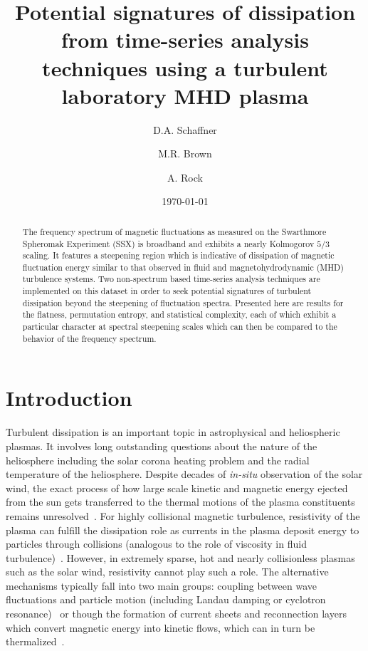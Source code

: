 \documentclass[aip,pop,amsmath,amssymb,preprint,superscriptaddress]{revtex4-1} %
\begin{document}
\title{Potential signatures of dissipation from time-series analysis techniques using a turbulent laboratory MHD plasma}
\author{D.A. Schaffner}
\author{M.R. Brown}
\author{A. Rock}
\date{\today}
\begin{abstract}
The frequency spectrum of magnetic fluctuations as measured on the Swarthmore Spheromak Experiment (SSX) is broadband and exhibits a nearly Kolmogorov $5/3$ scaling. It features a steepening region which is indicative of dissipation of magnetic fluctuation energy similar to that observed in fluid and magnetohydrodynamic (MHD) turbulence systems. Two non-spectrum based time-series analysis techniques are implemented on this dataset in order to seek potential signatures of turbulent dissipation beyond the steepening of fluctuation spectra. Presented here are results for the flatness, permutation entropy, and statistical complexity, each of which exhibit a particular character at spectral steepening scales which can then be compared to the behavior of the frequency spectrum.
\end{abstract}
\maketitle

\section{Introduction}

Turbulent dissipation is an important topic in astrophysical and heliospheric plasmas. It involves long outstanding questions about the nature of the heliosphere including the solar corona heating problem and the radial temperature of the heliosphere. Despite decades of \textit{in-situ} observation of the solar wind, the exact process of how large scale kinetic and magnetic energy ejected from the sun gets transferred to the thermal motions of the plasma constituents remains unresolved~\cite{kiyani2015}. For highly collisional magnetic turbulence, resistivity of the plasma can fulfill the dissipation role as currents in the plasma deposit energy to particles through collisions (analogous to the role of viscosity in fluid turbulence)~\cite{biskamp2003,zhou2004}. However, in extremely sparse, hot and nearly collisionless plasmas such as the solar wind, resistivity cannot play such a role. The alternative mechanisms typically fall into two main groups: coupling between wave fluctuations and particle motion (including Landau damping or cyclotron resonance)~\cite{sahraoui2009} or though the formation of current sheets and reconnection layers which convert magnetic energy into kinetic flows, which can in turn be thermalized~\cite{osmin2014}.
\end{document}
